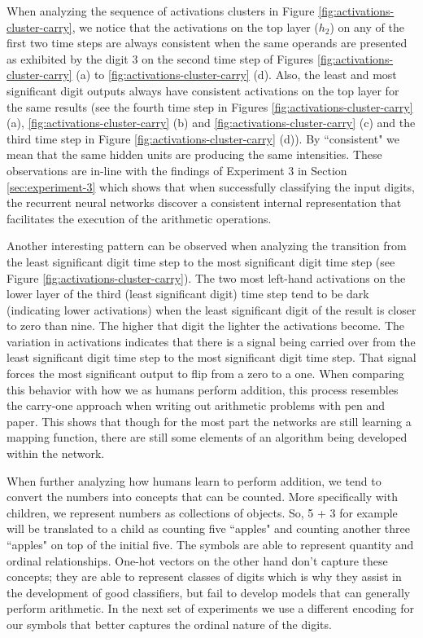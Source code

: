 When analyzing the sequence of activations clusters in Figure \ref{fig:activations-cluster-carry}, we notice that the activations on the top layer ($h_2$) on any of the first two time steps are always consistent when the same operands are presented as exhibited by the digit 3 on the second time step of Figures \ref{fig:activations-cluster-carry} (a) to \ref{fig:activations-cluster-carry} (d). Also, the least and most significant digit outputs always have consistent activations on the top layer for the same results (see the fourth time step in Figures \ref{fig:activations-cluster-carry} (a), \ref{fig:activations-cluster-carry} (b) and \ref{fig:activations-cluster-carry} (c) and the third time step in Figure \ref{fig:activations-cluster-carry} (d)). By ``consistent" we mean that the same hidden units are producing the same intensities. These observations are in-line with the findings of Experiment 3 in Section \ref{sec:experiment-3} which shows that when successfully classifying the input digits, the recurrent neural networks discover a consistent internal representation that facilitates the execution of the arithmetic operations.

Another interesting pattern can be observed when analyzing the transition from the least significant digit time step to the most significant digit time step (see Figure \ref{fig:activations-cluster-carry}). The two most left-hand activations on the lower layer of the third (least significant digit) time step tend to be dark (indicating lower activations) when the least significant digit of the result is closer to zero than nine. The higher that digit the lighter the activations become. The variation in activations indicates that there is a signal being carried over from the least significant digit time step to the most significant digit time step. That signal forces the most significant output to flip from a zero to a one. When comparing this behavior with how we as humans perform addition, this process resembles the carry-one approach when writing out arithmetic problems with pen and paper. This shows that though for the most part the networks are still learning a mapping function, there are still some elements of an algorithm being developed within the network.

When further analyzing how humans learn to perform addition, we tend to convert the numbers into concepts that can be counted. More specifically with children, we represent numbers as collections of objects. So, 5 + 3 for example will be translated to a child as counting five ``apples" and counting another three ``apples" on top of the initial five. The symbols are able to represent quantity and ordinal relationships. One-hot vectors on the other hand don't capture these concepts; they are able to represent classes of digits which is why they assist in the development of good classifiers, but fail to develop models that can generally perform arithmetic. In the next set of experiments we use a different encoding for our symbols that better captures the ordinal nature of the digits.